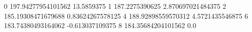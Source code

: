 0 197.94277954101562 13.5859375
1 187.2275390625 2.870697021484375
2 185.19308471679688 0.83624267578125
4 188.92898559570312 4.5721435546875
6 183.74380493164062 -0.613037109375
8 184.35684204101562 0.0
